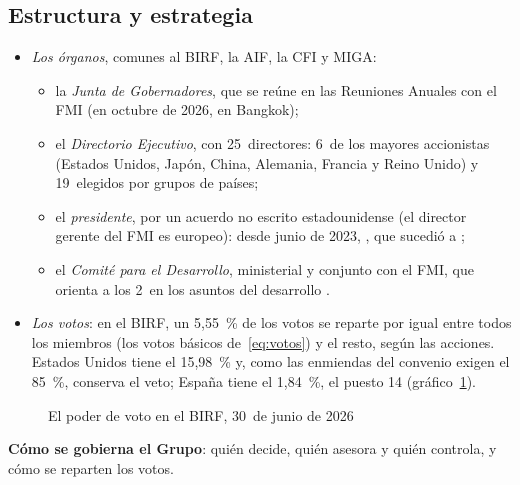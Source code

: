 \documentclass[11pt]{article}
\begin{document}
\subsection{Estructura y estrategia}\label{sec:gbm-estructura}

\begin{itemize}
\item \emph{Los órganos}, comunes al BIRF, la AIF, la CFI y MIGA:
  \begin{itemize}
  \item la \emph{Junta de Gobernadores}, que se reúne en las Reuniones Anuales con el FMI (en octubre de 2026, en Bangkok)\nocite{BM2026InformeAnual};
  \item el \emph{Directorio Ejecutivo}, con 25~directores: 6~de los mayores accionistas (Estados Unidos, Japón, China, Alemania, Francia y Reino Unido) y 19~elegidos por grupos de países;
  \item el \emph{presidente}, por un acuerdo no escrito estadounidense (el director gerente del FMI es europeo): desde junio de 2023, , que sucedió a \nocite{CD2026Accionariado};
  \item el \emph{Comité para el Desarrollo}, ministerial y conjunto con el FMI, que orienta a los 2~en los asuntos del desarrollo .
  \end{itemize}
\item \emph{Los votos}: en el BIRF, un 5,55~\% de los votos se reparte por igual entre todos los miembros (los votos básicos de~\eqref{eq:votos}) y el resto, según las acciones. Estados Unidos tiene el 15,98~\% y, como las enmiendas del convenio exigen el 85~\%, conserva el veto; España tiene el 1,84~\%, el puesto 14 (gráfico~\ref{fig:votos-birf})\nocite{BM2026Votos}.
\end{itemize}

\begin{figure}[H]
\centering
\caption{El poder de voto en el BIRF, 30~de junio de 2026}\label{fig:votos-birf}
\end{figure}

\begin{anotaciones}
\textbf{Cómo se gobierna el Grupo}: quién decide, quién asesora y quién controla, y cómo se reparten los votos.
\begin{infografiacaja}
\caption{El gobierno del Grupo del Banco Mundial y el voto en el BIRF}\label{figu:gobierno-gbm}
\end{infografiacaja}
\end{anotaciones}
\end{document}
